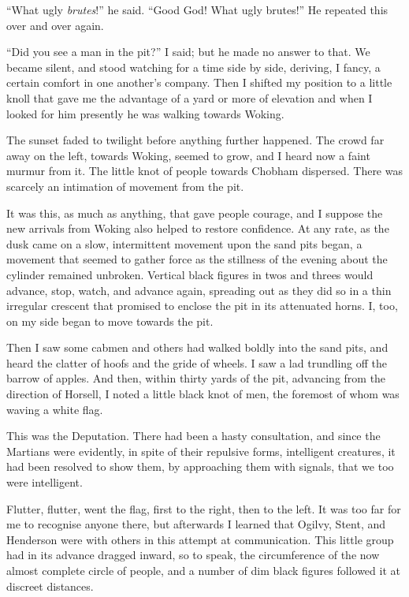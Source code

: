 ``What ugly \emph{brutes}!'' he said. ``Good God! What ugly brutes!''
He repeated this over and over again.

``Did you see a man in the pit?'' I said; but he made no answer to
that. We became silent, and stood watching for a time side by side,
deriving, I fancy, a certain comfort in one another's company. Then
I shifted my position to a little knoll that gave me the advantage
of a yard or more of elevation and when I looked for him presently
he was walking towards Woking.

The sunset faded to twilight before anything further happened. The
crowd far away on the left, towards Woking, seemed to grow, and I
heard now a faint murmur from it. The little knot of people towards
Chobham dispersed. There was scarcely an intimation of movement
from the pit.

It was this, as much as anything, that gave people courage, and I
suppose the new arrivals from Woking also helped to restore
confidence. At any rate, as the dusk came on a slow, intermittent
movement upon the sand pits began, a movement that seemed to gather
force as the stillness of the evening about the cylinder remained
unbroken. Vertical black figures in twos and threes would advance,
stop, watch, and advance again, spreading out as they did so in a
thin irregular crescent that promised to enclose the pit in its
attenuated horns. I, too, on my side began to move towards the
pit.

Then I saw some cabmen and others had walked boldly into the sand
pits, and heard the clatter of hoofs and the gride of wheels. I saw
a lad trundling off the barrow of apples. And then, within thirty
yards of the pit, advancing from the direction of Horsell, I noted
a little black knot of men, the foremost of whom was waving a white
flag.

This was the Deputation. There had been a hasty consultation, and
since the Martians were evidently, in spite of their repulsive
forms, intelligent creatures, it had been resolved to show them, by
approaching them with signals, that we too were intelligent.

Flutter, flutter, went the flag, first to the right, then to the
left. It was too far for me to recognise anyone there, but
afterwards I learned that Ogilvy, Stent, and Henderson were with
others in this attempt at communication. This little group had in
its advance dragged inward, so to speak, the circumference of the
now almost complete circle of people, and a number of dim black
figures followed it at discreet distances.

